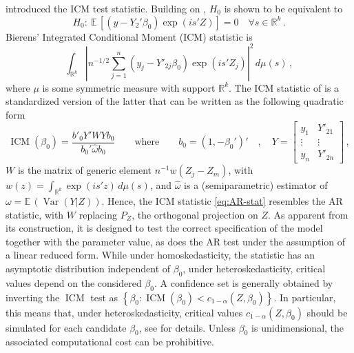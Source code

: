 \documentclass[12pt]{article}
\newcommand{\E}{\operatorname{E}}
\newcommand{\1}{\mathbf{1}}
\newcommand{\Var}{\operatorname{Var}}
\def\E{\mathbb{E}\,}
\def\Rit{\mathbb{R}}
\newcommand{\ICM}{\operatorname{ICM}}
\begin{document}
\cite{antoine_identification-robust_2023} introduced the ICM test
statistic. Building on  \cite{Bierens82},  ${H}_{0}$  is shown to be equivalent to
\begin{equation}
{H}_{0}: \
\E \left[ \left( y - Y_{2}'\beta_0 \right)
\exp( i s'Z) \right] = 0  \quad \forall s\in\mathbb{R}^k
\, .
\label{icmexp}
\end{equation}
Bierens' Integrated Conditional Moment (ICM) statistic is
\begin{equation}
 \int_{\Rit^{k}}{|n^{-1/2} \sum_{j=1}^{n}{ \left(y_j -
     Y'_{2j}\beta_{0}\right) \exp(i s'Z_{j})}|^{2} \, d\mu (s)}  \, ,
\label{icm}
\end{equation}
where $\mu$ is some symmetric measure with support $\Rit^{k}$.
The  ICM statistic of \cite{antoine_identification-robust_2023} is  a
standardized version of the latter that can be
written as the following quadratic form
\begin{equation} \label{eq:AR-stat}
\ICM (\beta_{0}) = \frac{b'_0 Y' W Y b_{0}}{b_{0}'\widehat{\omega}
b_{0}} \qquad \text{where} \qquad b_0 = (1, - \beta_0')' \quad , \quad
{Y} =
\left[
\begin{array}{cc}
y_{1} & Y'_{21} \\
\vdots & \vdots \\
y_{n} & Y'_{2n}
\end{array}
\right]
\, ,
\end{equation}
 $W$ is the matrix of generic element
$n^{-1}w\left(Z_{j}-Z_{m}\right)$, with $w(z) = \int_{\Rit^{k}} \exp(i
s'z) \, d\mu(s)$, and $\widehat{\omega}$ is a (semiparametric)
estimator of $\omega = \E (\Var(Y|Z))$.  Hence, the ICM statistic
\eqref{eq:AR-stat} resembles the AR statistic, with $W$ replacing
$P_{Z}$, the orthogonal projection on $Z$.  As apparent from its
construction, it is designed to test {the correct specification of the
model} together with the parameter value, as does the AR test under
the assumption of a linear reduced form. While under homoskedasticity,
the statistic has an asymptotic distribution independent of $\beta_0$,
under heteroskedasticity, critical values depend on the considered
$\beta_0$.
A confidence set is generally obtained by inverting the $\ICM$
test as $\left\{ \beta_{0} : \ICM(\beta_{0}) < c_{1-\alpha}(Z, \beta_0)
\right\}$. In particular, this means that, under heteroskedasticity, critical values
$c_{1-\alpha}(Z, \beta_0)$ should be simulated for each candidate
$\beta_0$, see \cite{antoine_identification-robust_2023} for details.
Unless  $\beta_0$ is unidimensional, the associated computational cost can be prohibitive.
\end{document}
